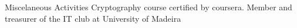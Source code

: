 
\begin{rubric}{Miscelaneous Activities}
		Cryptography course certified by coursera.
		Member and treasurer of the IT club at University of Madeira
\end{rubric}
